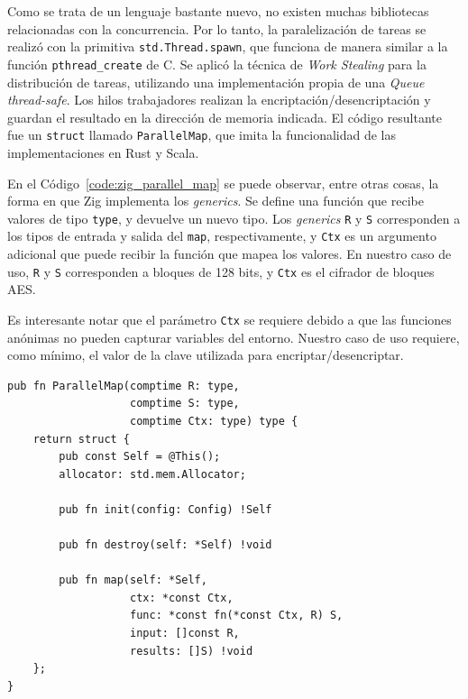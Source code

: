 \documentclass[11pt]{article}
\newcommand{\english}[1]{\textit{#1}}
\begin{document}
Como se trata de un lenguaje bastante nuevo, no existen muchas bibliotecas relacionadas con la concurrencia. Por lo tanto, la paralelización de tareas se realizó con la primitiva \lstinline{std.Thread.spawn}, que funciona de manera similar a la función \lstinline{pthread_create} de C. Se aplicó la técnica de \english{Work Stealing} para la distribución de tareas, utilizando una implementación propia de una \english{Queue} \english{thread-safe}. Los hilos trabajadores realizan la encriptación/desencriptación y guardan el resultado en la dirección de memoria indicada. El código resultante fue un \lstinline{struct} llamado \lstinline{ParallelMap}, que imita la funcionalidad de las implementaciones en Rust y Scala.

En el Código~\ref{code:zig_parallel_map} se puede observar, entre otras cosas, la forma en que Zig implementa los \english{generics}. Se define una función que recibe valores de tipo \lstinline{type}, y devuelve un nuevo tipo. Los \english{generics} \lstinline{R} y \lstinline{S} corresponden a los tipos de entrada y salida del \lstinline{map}, respectivamente, y \lstinline{Ctx} es un argumento adicional que puede recibir la función que mapea los valores. En nuestro caso de uso, \lstinline{R} y \lstinline{S} corresponden a bloques de 128 bits, y \lstinline{Ctx} es el cifrador de bloques AES. 

Es interesante notar que el parámetro \lstinline{Ctx} se requiere debido a que las funciones anónimas no pueden capturar variables del entorno. Nuestro caso de uso requiere, como mínimo, el valor de la clave utilizada para encriptar/desencriptar.

\begin{listing}[h]
\begin{verbatim}
pub fn ParallelMap(comptime R: type,
                   comptime S: type,
                   comptime Ctx: type) type {
    return struct {
        pub const Self = @This();
        allocator: std.mem.Allocator;

        pub fn init(config: Config) !Self

        pub fn destroy(self: *Self) !void

        pub fn map(self: *Self,
                   ctx: *const Ctx,
                   func: *const fn(*const Ctx, R) S,
                   input: []const R,
                   results: []S) !void
    };
}
\end{verbatim}
\caption{Definición abreviada del \lstinline{ParallelMap} en Zig}
\label{code:zig_parallel_map}
\end{listing}
\end{document}
